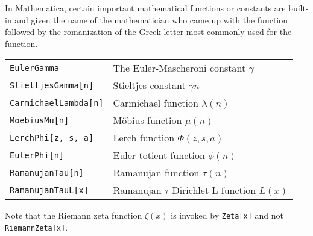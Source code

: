 \documentclass[12pt]{article}
\begin{document}
In Mathematica, certain important mathematical functions or constants are built-in and given the name of the mathematician who came up with the function followed by the romanization of the Greek letter most commonly used for the function.

\begin{tabular}{|l|l|}
\verb=EulerGamma= & The Euler-Mascheroni constant $\gamma$ \\
\verb=StieltjesGamma[n]= & Stieltjes constant $\gamma n$ \\
\verb=CarmichaelLambda[n]= & Carmichael function $\lambda(n)$ \\
\verb=MoebiusMu[n]= & M\"obius function $\mu(n)$ \\
\verb=LerchPhi[z, s, a]= & Lerch function $\Phi(z, s, a)$ \\
\verb=EulerPhi[n]= & Euler totient function $\phi(n)$ \\
\verb=RamanujanTau[n]= & Ramanujan function $\tau(n)$ \\
\verb=RamanujanTauL[x]= & Ramanujan $\tau$ Dirichlet L function $L(x)$ \\
\end{tabular}

Note that the Riemann zeta function $\zeta(x)$ is invoked by \verb=Zeta[x]= and not \verb=RiemannZeta[x]=.

\end{document}
